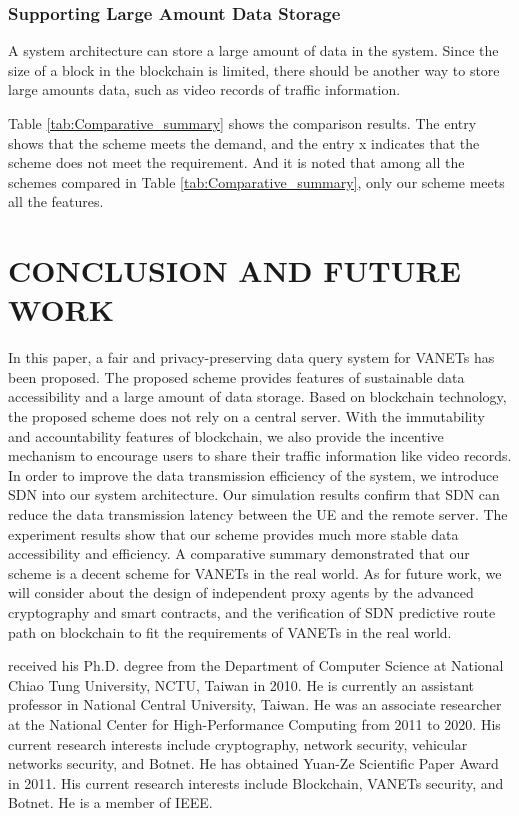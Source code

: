 \documentclass[journal]{IEEEtran}
\renewenvironment{IEEEbiography}[1]
  {\IEEEbiographynophoto{#1}}
  {\endIEEEbiographynophoto}
\begin{document}
    \subsubsection{Supporting Large Amount Data Storage}
    
    A system architecture can store a large amount of data in the system. Since the size of a block in the blockchain is limited, there should be another way to store large amounts data, such as video records of traffic information.

    Table \ref{tab:Comparative_summary} shows the comparison results. The entry \checkmark shows that the scheme meets the demand, and the entry x indicates that the scheme does not meet the requirement. And it is noted that among all the schemes compared in Table \ref{tab:Comparative_summary}, only our scheme meets all the features. 

    \section{CONCLUSION AND FUTURE WORK}
    
    In this paper, a fair and privacy-preserving data query system for VANETs has been proposed. The proposed scheme provides features of sustainable data accessibility and a large amount of data storage. Based on blockchain technology, the proposed scheme does not rely on a central server. With the immutability and accountability features of blockchain, we also provide the incentive mechanism to encourage users to share their traffic information like video records. In order to improve the data transmission efficiency of the system, we introduce SDN into our system architecture. Our simulation results confirm that SDN can reduce the data transmission latency between the UE and the remote server. The experiment results show that our scheme provides much more stable data accessibility and efficiency. A comparative summary demonstrated that our scheme is a decent scheme for VANETs in the real world. As for future work, we will consider about the design of independent proxy agents by the advanced cryptography and smart contracts, and the verification of SDN predictive route path on blockchain to fit the requirements of VANETs in the real world.

    
    
    
    
	\begin{IEEEbiography}{Lo-Yao Yeh}
	received his Ph.D. degree from the Department of Computer Science at National Chiao Tung University, NCTU, Taiwan in 2010. He is currently an assistant professor in National Central University, Taiwan. He was an associate researcher at the National Center for High-Performance Computing from 2011 to 2020. His current research interests include cryptography, network security, vehicular networks security, and Botnet. He has obtained Yuan-Ze Scientific Paper Award in 2011. His current research interests include Blockchain, VANETs security, and Botnet. He is a member of IEEE.
	\end{IEEEbiography}
    
\end{document}
